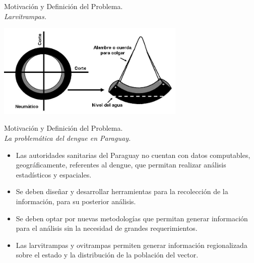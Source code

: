 \begin{frame}[t]{Motivación y Definición del Problema.\\\textit{Larvitrampas.}}
  \begin{center}
    \includegraphics[width=9cm]{../book/anexos/graphics/construccion-larvitrampa.png}
  \end{center}
\end{frame}

\begin{frame}[t]{Motivación y Definición del Problema.
\\\textit{La problemática del dengue en Paraguay.}}
  \begin{itemize}

    \item Las autoridades sanitarias del Paraguay no cuentan con datos computables, geográficamente, referentes al dengue, que permitan realizar análisis estadísticos y espaciales.

    \item Se deben diseñar y desarrollar herramientas para la recolección de la información, para su posterior análisis.

    \item Se deben optar por nuevas metodologías que permitan generar información para el análisis sin la necesidad de grandes requerimientos.

    \item Las larvitrampas y ovitrampas permiten generar información regionalizada sobre el estado y la distribución de la población del vector.

  \end{itemize}
\end{frame}

